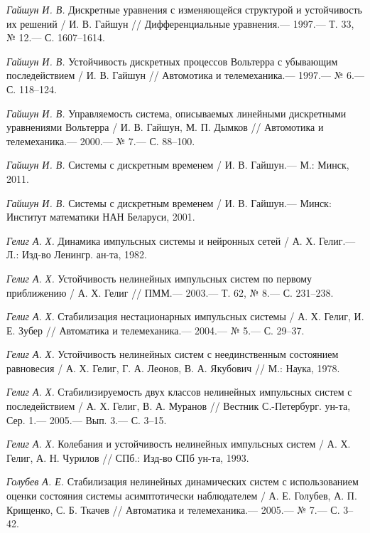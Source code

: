 \begin{thebibliography}{10}
	{\it Гайшун И. В.} Дискретные уравнения с изменяющейся структурой и устойчивость их решений /
	И. В. Гайшун // Дифференциальные уравнения.— 1997.— Т. 33, № 12.— С. 1607–1614.
	
	{\it Гайшун И. В.} Устойчивость дискретных процессов Вольтерра с убывающим последействием /
	И. В. Гайшун // Автомотика и телемеханика.— 1997.— № 6.— С. 118–124.
	
	{\it Гайшун И. В.} Управляемость система, описываемых линейными дискретными уравнениями Вольтерра /
	И. В. Гайшун, М. П. Дымков // Автомотика и телемеханика.— 2000.— № 7.— С. 88–100.
	
	{\it Гайшун И. В.} Системы с дискретным временем /
	И. В. Гайшун.— М.: Минск, 2011.
	
	
	{\it Гайшун И. В.} Системы с дискретным временем /
	И. В. Гайшун.— Минск: Институт математики НАН Беларуси, 2001.
	
	{\it Гелиг А. Х.} Динамика импульсных системы и нейронных сетей /
	А. Х. Гелиг.— Л.: Изд-во Ленингр. ан-та, 1982.
	
	{\it Гелиг А. Х.} Устойчивость нелинейных импульсных систем по первому приближению /
	А. Х. Гелиг // ПММ.— 2003.— Т. 62, № 8.— С. 231–238.
	
	{\it Гелиг А. Х.} Стабилизация нестационарных импульсных системы /
	А. Х. Гелиг, И. Е. Зубер // Автоматика и телемеханика.— 2004.— № 5.— С. 29–37.
	
	{\it Гелиг А. Х.} Устойчивость нелинейных систем с неединственным состоянием равновесия /
	А. Х. Гелиг, Г. А. Леонов, В. А. Якубович // М.: Наука, 1978.
	
	{\it Гелиг А. Х.} Стабилизируемость двух классов нелинейных импульсных систем с последействием /
	А. Х. Гелиг, В. А. Муранов // Вестник С.-Петербург. ун-та, Сер. 1.— 2005.— Вып. 3.— С. 3–15.
	
	{\it Гелиг А. Х.} Колебания и устойчивость нелинейных импульсных систем /
	А. Х. Гелиг, А. Н. Чурилов // СПб.: Изд-во СПб ун-та, 1993.
	
	{\it Голубев А. Е.} Стабилизация нелинейных динамических систем с использованием оценки состояния системы асимптотически наблюдателем / А. Е. Голубев, А. П. Крищенко, С. Б. Ткачев // Автоматика и телемеханика.— 2005.— № 7.— С. 3–42.
	

\end{thebibliography}
